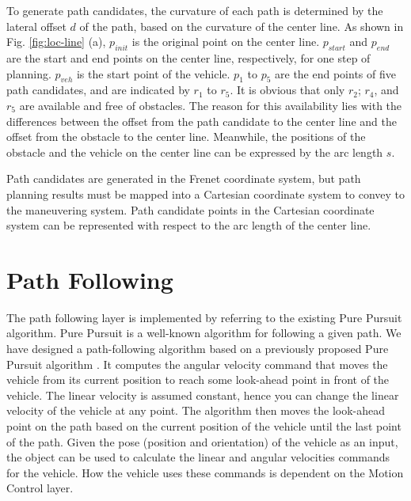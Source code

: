 To generate path candidates, the curvature of each path is determined by the lateral offset $d$ of the path, based on the curvature of the center line. As shown in Fig. \ref{fig:loc-line} (a), $p_{init}$ is the original point on the center line. $p_{start}$ and $p_{end}$ are the start and end points on the center line, respectively, for one step of planning. $p_{veh}$ is the start point of the vehicle. $p_1$ to $p_5$ are the end points of five path candidates, and are indicated by $r_1$ to $r_5$. It is obvious that only $r_2$; $r_4$, and $r_5$ are available and free of obstacles. The reason for this availability lies with the differences between the offset from the path candidate to the center line and the offset from the obstacle to the center line. Meanwhile, the positions of the obstacle and the vehicle on the center line can be expressed by the arc length $s$.

Path candidates are generated in the Frenet coordinate system, but path planning results must be mapped into a Cartesian coordinate system to convey to the maneuvering system. Path candidate points in the Cartesian coordinate system can be represented with respect to the arc length of the center line.

\section{Path Following}

The path following layer is implemented by referring to the existing Pure Pursuit algorithm. Pure Pursuit is a well-known algorithm for following a given path. We have designed a path-following algorithm based on a previously proposed Pure Pursuit algorithm \cite{PurePursuit1992}. It computes the angular velocity command that moves the vehicle from its current position to reach some look-ahead point in front of the vehicle. The linear velocity is assumed constant, hence you can change the linear velocity of the vehicle at any point. The algorithm then moves the look-ahead point on the path based on the current position of the vehicle until the last point of the path. Given the pose (position and orientation) of the vehicle as an input, the object can be used to calculate the linear and angular velocities commands for the vehicle. How the vehicle uses these commands is dependent on the Motion Control layer.

